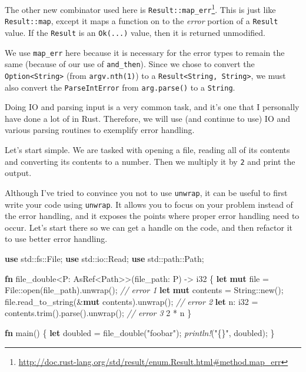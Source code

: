 \documentclass[a4paper,]{book}
\newenvironment{Shaded}{\begin{snugshade}}{\end{snugshade}}
\newcommand{\KeywordTok}[1]{\textcolor[rgb]{0.13,0.29,0.53}{\textbf{{#1}}}}
\newcommand{\DataTypeTok}[1]{\textcolor[rgb]{0.13,0.29,0.53}{{#1}}}
\newcommand{\DecValTok}[1]{\textcolor[rgb]{0.00,0.00,0.81}{{#1}}}
\newcommand{\StringTok}[1]{\textcolor[rgb]{0.31,0.60,0.02}{{#1}}}
\newcommand{\CommentTok}[1]{\textcolor[rgb]{0.56,0.35,0.01}{\textit{{#1}}}}
\newcommand{\PreprocessorTok}[1]{\textcolor[rgb]{0.56,0.35,0.01}{\textit{{#1}}}}
\newcommand{\NormalTok}[1]{{#1}}
\renewcommand{\href}[2]{#2\footnote{\url{#1}}}
\begin{document}
The other new combinator used here is
\href{http://doc.rust-lang.org/std/result/enum.Result.html\#method.map_err}{\texttt{Result::map\_err}}.
This is just like \texttt{Result::map}, except it maps a function on to
the \emph{error} portion of a \texttt{Result} value. If the
\texttt{Result} is an \texttt{Ok(...)} value, then it is returned
unmodified.

We use \texttt{map\_err} here because it is necessary for the error
types to remain the same (because of our use of \texttt{and\_then}).
Since we chose to convert the
\texttt{Option\textless{}String\textgreater{}} (from
\texttt{argv.nth(1)}) to a
\texttt{Result\textless{}String,\ String\textgreater{}}, we must also
convert the \texttt{ParseIntError} from \texttt{arg.parse()} to a
\texttt{String}.


Doing IO and parsing input is a very common task, and it's one that I
personally have done a lot of in Rust. Therefore, we will use (and
continue to use) IO and various parsing routines to exemplify error
handling.

Let's start simple. We are tasked with opening a file, reading all of
its contents and converting its contents to a number. Then we multiply
it by \texttt{2} and print the output.

Although I've tried to convince you not to use \texttt{unwrap}, it can
be useful to first write your code using \texttt{unwrap}. It allows you
to focus on your problem instead of the error handling, and it exposes
the points where proper error handling need to occur. Let's start there
so we can get a handle on the code, and then refactor it to use better
error handling.

\begin{Shaded}
\begin{Highlighting}[]
\KeywordTok{use} \NormalTok{std::fs::File;}
\KeywordTok{use} \NormalTok{std::io::Read;}
\KeywordTok{use} \NormalTok{std::path::Path;}

\KeywordTok{fn} \NormalTok{file_double<P: AsRef<Path>>(file_path: P) -> }\DataTypeTok{i32} \NormalTok{\{}
    \KeywordTok{let} \KeywordTok{mut} \NormalTok{file = File::open(file_path).unwrap(); }\CommentTok{// error 1}
    \KeywordTok{let} \KeywordTok{mut} \NormalTok{contents = }\DataTypeTok{String}\NormalTok{::new();}
    \NormalTok{file.read_to_string(&}\KeywordTok{mut} \NormalTok{contents).unwrap(); }\CommentTok{// error 2}
    \KeywordTok{let} \NormalTok{n: }\DataTypeTok{i32} \NormalTok{= contents.trim().parse().unwrap(); }\CommentTok{// error 3}
    \DecValTok{2} \NormalTok{* n}
\NormalTok{\}}

\KeywordTok{fn} \NormalTok{main() \{}
    \KeywordTok{let} \NormalTok{doubled = file_double(}\StringTok{"foobar"}\NormalTok{);}
    \PreprocessorTok{println!}\NormalTok{(}\StringTok{"\{\}"}\NormalTok{, doubled);}
\NormalTok{\}}
\end{Highlighting}
\end{Shaded}
\end{document}
